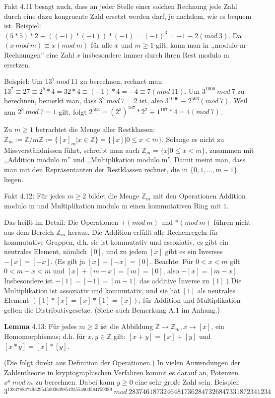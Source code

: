 \documentclass[a4paper]{article}
\begin{document}
\begin{multicols}{3}
    Fakt 4.11 besagt auch, dass an jeder Stelle einer solchen Rechnung jede Zahl durch eine dazu kongruente Zahl ersetzt werden darf, je nachdem, wie es bequem ist. Beispiel: $(5*5)* 2 \equiv((-1)*(-1))*(-1) = (-1)^3 =- 1 \equiv 2 (mod\ 3)$. Da $(x\ mod\ m)\equiv x(mod\ m)$ für alle $x$ und $m\geq 1$ gilt, kann man in ,,modulo-m-Rechnungen'' eine Zahl $x$ insbesondere immer durch ihren Rest modulo m ersetzen.

    Beispiel: Um $13^7\ mod\ 11$ zu berechnen, rechnet man $13^7\equiv 27\equiv 2^5*4 =32* 4\equiv (-1)*4 = -4\equiv 7(mod\ 11)$. Um $3^{1006}\ mod\ 7$ zu berechnen, bemerkt man, dass $3^2\ mod\ 7=2$ ist, also $3^{1006}\equiv 2^{503}(mod\ 7)$. Weil nun $2^3\ mod\ 7=1$ gilt, folgt $2^{503}=(2^3)^{167} * 2^2 \equiv 1^{167}*4=4(mod\ 7)$.

    Zu $m\geq 1$ betrachtet die Menge aller Restklassen: $\mathbb{Z}_m:=\mathbb{Z}/m\mathbb{Z}:=\{[x]_m|x\in\mathbb{Z}\}=\{[x]| 0 \leq x<m\}$. Solange es nicht zu Missverständnissen führt, schreibt man auch $\mathbb{Z}_m=\{x|0 \leq x < m\}$, zusammen mit ,,Addition modulo m'' und ,,Multiplikation modulo m''. Damit meint man, dass man mit den Repräsentanten der Restklassen rechnet, die in $\{0,1 ,...,m-1\}$ liegen.

    Fakt 4.12: Für jedes $m\geq 2$ bildet die Menge $\mathbb{Z}_m$ mit den Operationen Addition modulo m und Multiplikation modulo m einen kommutativen Ring mit $1$.

    Das heißt im Detail: Die Operationen $+(mod\ m)$ und $*(mod\ m)$ führen nicht aus dem Bereich $\mathbb{Z}_m$ heraus. Die Addition erfüllt alle Rechenregeln für kommutative Gruppen, d.h. sie ist kommutativ und assoziativ, es gibt ein neutrales Element, nämlich $[0]$, und zu jedem $[x]$ gibt es ein Inverses $-[x]=[-x]$. (Es gilt ja $[x] + [-x] = [0]$. Beachte: Für $0 < x < m$ gilt $0< m-x < m$ und $[x]+[m-x]=[m]=[0]$, also $-[x]=[m-x]$. Insbesondere ist $-[1]=[-1]=[m-1]$ das additive Inverse zu $[1]$.) Die Multiplikation ist assoziativ und kommutativ, und sie hat $[1]$ als neutrales Element $([1]*[x] = [x]*[1] = [x])$; für Addition und Multiplikation gelten die Distributivgesetze. (Siehe auch Bemerkung A.1 im Anhang.)

    \textbf{Lemma} 4.13: Für jedes $m\geq 2$ ist die Abbildung $\mathbb{Z}\rightarrow\mathbb{Z}_m ,x\rightarrow [x]$, ein Homomorphismus; d.h. für $x,y\in\mathbb{Z}$ gilt: $[x+y]=[x]+[y]$ und $[x*y] = [x]*[y]$.

    (Die folgt direkt aus Definition der Operationen.)
    In vielen Anwendungen der Zahlentheorie in kryptographischen Verfahren kommt es darauf an, Potenzen $x^y\ mod\ m$ zu berechnen. Dabei kann $y\geq 0$ eine sehr große Zahl sein. Beispiel: $3^{1384788374932954500363985493554603584759389}\ mod\ 28374618732464817362847326847331872341234$


\end{multicols}
\end{document}
